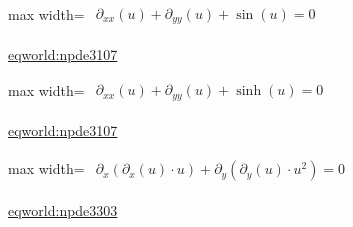 \documentclass[UTF8,10pt,a4paper,fontset=mac]{ctexart}
\begin{document}
\begin{minipage}{\linewidth}\begin{center}\begin{adjustbox}{max width=\linewidth}$\displaystyle\begin{gathered}\begin{gathered}\partial_{xx}(u)+\partial_{yy}(u)+\sin(u)=0\end{gathered}\end{gathered}$\end{adjustbox}\end{center}{\small\href{https://eqworld.ipmnet.ru/en/solutions/npde/npde3107.pdf}{eqworld:npde3107}}\par\end{minipage}\par\vspace{6mm}

\begin{minipage}{\linewidth}\begin{center}\begin{adjustbox}{max width=\linewidth}$\displaystyle\begin{gathered}\begin{gathered}\partial_{xx}(u)+\partial_{yy}(u)+\sinh(u)=0\end{gathered}\end{gathered}$\end{adjustbox}\end{center}{\small\href{https://eqworld.ipmnet.ru/en/solutions/npde/npde3107.pdf}{eqworld:npde3107}}\par\end{minipage}\par\vspace{6mm}

\begin{minipage}{\linewidth}\begin{center}\begin{adjustbox}{max width=\linewidth}$\displaystyle\begin{gathered}\begin{gathered}\partial_{x}(\partial_{x}(u)\cdot u)+\partial_{y}(\partial_{y}(u)\cdot u^{2})=0\end{gathered}\end{gathered}$\end{adjustbox}\end{center}{\small\href{https://eqworld.ipmnet.ru/en/solutions/npde/npde3303.pdf}{eqworld:npde3303}}\par\end{minipage}\par\vspace{6mm}
\end{document}
